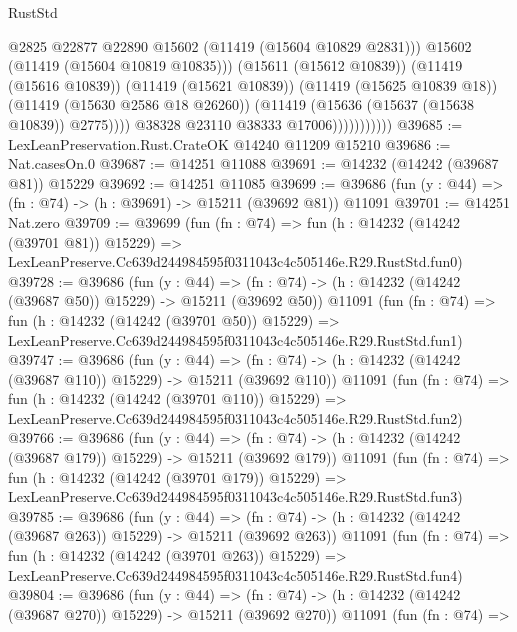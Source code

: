 \begin{lexlean}{RustStd}
\begin{coremodule}
                                  @2825
                                  @22877
                                  @22890
                                  @15602
                                  (@11419 (@15604 @10829 @2831)))
                                @15602
                                (@11419 (@15604 @10819 @10835)))
                              (@15611 (@15612 @10839))
                              (@11419 (@15616 @10839))
                              (@11419 (@15621 @10839))
                              (@11419 (@15625 @10839 @18))
                              (@11419 (@15630 @2586 @18 @26260))
                              (@11419 (@15636 (@15637 (@15638 @10839)) @2775))))
                          @38328
                          @23110
                          @38333
                          @17006)))))))))))
@39685 := LexLeanPreservation.Rust.CrateOK @14240 @11209 @15210
@39686 := Nat.casesOn.{0}
@39687 := @14251 @11088
@39691 := @14232 (@14242 (@39687 @81)) @15229
@39692 := @14251 @11085
@39699 := @39686 (fun (y : @44) => (fn : @74) -> (h : @39691) -> @15211 (@39692 @81)) @11091
@39701 := @14251 Nat.zero
@39709 := @39699
    (fun (fn : @74) =>
    fun (h : @14232 (@14242 (@39701 @81)) @15229) =>
    LexLeanPreserve.Cc639d244984595f0311043c4c505146e.R29.RustStd.fun0)
@39728 := @39686
    (fun (y : @44) =>
    (fn : @74) -> (h : @14232 (@14242 (@39687 @50)) @15229) -> @15211 (@39692 @50))
    @11091
    (fun (fn : @74) =>
    fun (h : @14232 (@14242 (@39701 @50)) @15229) =>
    LexLeanPreserve.Cc639d244984595f0311043c4c505146e.R29.RustStd.fun1)
@39747 := @39686
    (fun (y : @44) =>
    (fn : @74) -> (h : @14232 (@14242 (@39687 @110)) @15229) -> @15211 (@39692 @110))
    @11091
    (fun (fn : @74) =>
    fun (h : @14232 (@14242 (@39701 @110)) @15229) =>
    LexLeanPreserve.Cc639d244984595f0311043c4c505146e.R29.RustStd.fun2)
@39766 := @39686
    (fun (y : @44) =>
    (fn : @74) -> (h : @14232 (@14242 (@39687 @179)) @15229) -> @15211 (@39692 @179))
    @11091
    (fun (fn : @74) =>
    fun (h : @14232 (@14242 (@39701 @179)) @15229) =>
    LexLeanPreserve.Cc639d244984595f0311043c4c505146e.R29.RustStd.fun3)
@39785 := @39686
    (fun (y : @44) =>
    (fn : @74) -> (h : @14232 (@14242 (@39687 @263)) @15229) -> @15211 (@39692 @263))
    @11091
    (fun (fn : @74) =>
    fun (h : @14232 (@14242 (@39701 @263)) @15229) =>
    LexLeanPreserve.Cc639d244984595f0311043c4c505146e.R29.RustStd.fun4)
@39804 := @39686
    (fun (y : @44) =>
    (fn : @74) -> (h : @14232 (@14242 (@39687 @270)) @15229) -> @15211 (@39692 @270))
    @11091
    (fun (fn : @74) =>

\end{coremodule}
\end{lexlean}
